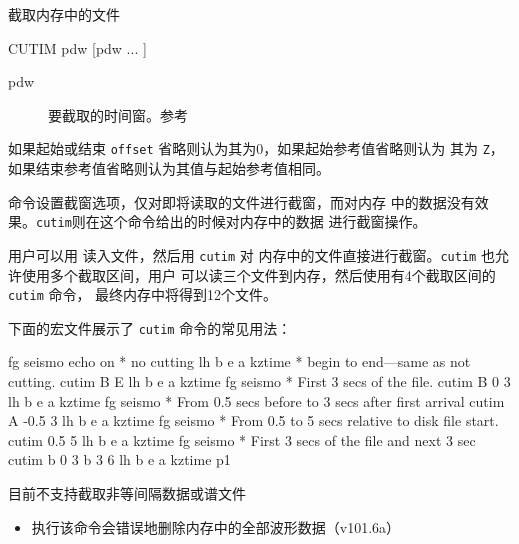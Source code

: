 \label{cmd:cutim}

截取内存中的文件

\begin{SACSTX}
CUTIM pdw [pdw ... ]
\end{SACSTX}

\begin{description}
\item [pdw] 要截取的时间窗。参考 
\end{description}

如果起始或结束 \texttt{offset} 省略则认为其为0，如果起始参考值省略则认为
其为 \texttt{Z}，如果结束参考值省略则认为其值与起始参考值相同。

 命令设置截窗选项，仅对即将读取的文件进行截窗，而对内存
中的数据没有效果。\texttt{cutim}则在这个命令给出的时候对内存中的数据
进行截窗操作。

用户可以用  读入文件，然后用 \texttt{cutim} 对
内存中的文件直接进行截窗。\texttt{cutim} 也允许使用多个截取区间，用户
可以读三个文件到内存，然后使用有4个截取区间的 \texttt{cutim} 命令，
最终内存中将得到12个文件。

下面的宏文件展示了 \texttt{cutim} 命令的常见用法：
\begin{SACCode}
fg seismo
echo on
* no cutting
lh b e a kztime
* begin to end---same as not cutting.
cutim B E
lh b e a kztime
fg seismo
* First 3 secs of the file.
cutim B 0 3
lh b e a kztime
fg seismo
* From 0.5 secs before to 3 secs after first arrival
cutim A -0.5 3
lh b e a kztime
fg seismo
* From 0.5 to 5 secs relative to disk file start.
cutim 0.5 5
lh b e a kztime
fg seismo
* First 3 secs of the file and next 3 sec
cutim b 0 3 b 3 6
lh b e a kztime
p1
\end{SACCode}

目前不支持截取非等间隔数据或谱文件

\begin{itemize}
\item 执行该命令会错误地删除内存中的全部波形数据（v101.6a）
\end{itemize}
